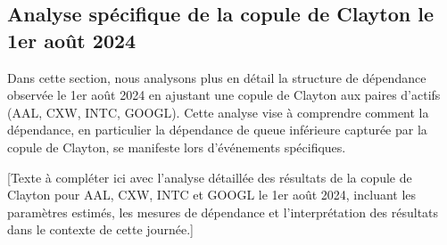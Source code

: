 \documentclass[12pt,a4paper]{article}
\theoremstyle{definition}
\theoremstyle{remark}
\begin{document}
\subsection{Analyse spécifique de la copule de Clayton le 1er août 2024}

Dans cette section, nous analysons plus en détail la structure de dépendance observée le 1er août 2024 en ajustant une copule de Clayton aux paires d'actifs (AAL, CXW, INTC, GOOGL). Cette analyse vise à comprendre comment la dépendance, en particulier la dépendance de queue inférieure capturée par la copule de Clayton, se manifeste lors d'événements spécifiques.

[Texte à compléter ici avec l'analyse détaillée des résultats de la copule de Clayton pour AAL, CXW, INTC et GOOGL le 1er août 2024, incluant les paramètres estimés, les mesures de dépendance et l'interprétation des résultats dans le contexte de cette journée.]
\end{document}
